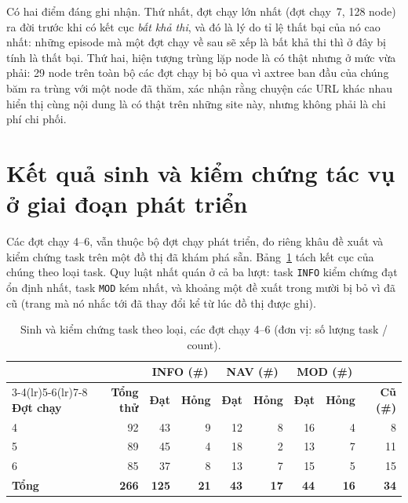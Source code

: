 \noindent
Có hai điểm đáng ghi nhận. Thứ nhất, đợt chạy lớn nhất (đợt chạy~7, 128 node) ra đời
trước khi có kết cục \emph{bất khả thi}, và đó là lý do tỉ lệ thất bại của nó
cao nhất: những episode mà một đợt chạy về sau sẽ xếp là bất khả thi thì ở đây bị
tính là thất bại. Thứ hai, hiện tượng trùng lặp node là có thật nhưng ở mức vừa
phải: 29 node trên toàn bộ các đợt chạy bị bỏ qua vì axtree ban đầu của chúng băm
ra trùng với một node đã thăm, xác nhận rằng chuyện các URL khác nhau hiển thị
cùng nội dung là có thật trên những site này, nhưng không phải là chi phí chi
phối.

\section{Kết quả sinh và kiểm chứng tác vụ ở giai đoạn phát triển}
\label{app:runs-gen}

Các đợt chạy 4--6, vẫn thuộc bộ đợt chạy phát triển, đo riêng khâu đề xuất và kiểm chứng
task trên một đồ thị đã khám phá sẵn. Bảng~\ref{tab:app-gen} tách kết cục của chúng theo loại task. Quy luật
nhất quán ở cả ba lượt: task \texttt{INFO} kiểm chứng đạt ổn định nhất, task
\texttt{MOD} kém nhất, và khoảng một đề xuất trong mười bị bỏ vì đã cũ (trang
mà nó nhắc tới đã thay đổi kể từ lúc đồ thị được ghi).

\begin{table}[H]
\centering
\caption[Sinh và kiểm chứng task theo loại]{Sinh và kiểm chứng task theo loại,
các đợt chạy 4--6 (đơn vị: số lượng task / count).}
\label{tab:app-gen}
\small
\begin{tabular}{@{}lrrrrrrrr@{}}
\toprule
& & \multicolumn{2}{c}{\textbf{INFO (\#)}} & \multicolumn{2}{c}{\textbf{NAV (\#)}} &
\multicolumn{2}{c}{\textbf{MOD (\#)}} & \\
\cmidrule(lr){3-4}\cmidrule(lr){5-6}\cmidrule(lr){7-8}
\textbf{Đợt chạy} & \textbf{Tổng thử} & \textbf{Đạt} & \textbf{Hỏng} & \textbf{Đạt} &
\textbf{Hỏng} & \textbf{Đạt} & \textbf{Hỏng} & \textbf{Cũ (\#)} \\
\midrule
4 & 92 & 43 &  9 & 12 & 8 & 16 & 4 &  8 \\
5 & 89 & 45 &  4 & 18 & 2 & 13 & 7 & 11 \\
6 & 85 & 37 &  8 & 13 & 7 & 15 & 5 & 15 \\
\midrule
\textbf{Tổng} & \textbf{266} & \textbf{125} & \textbf{21} & \textbf{43} &
\textbf{17} & \textbf{44} & \textbf{16} & \textbf{34} \\
\bottomrule
\end{tabular}
\end{table}

